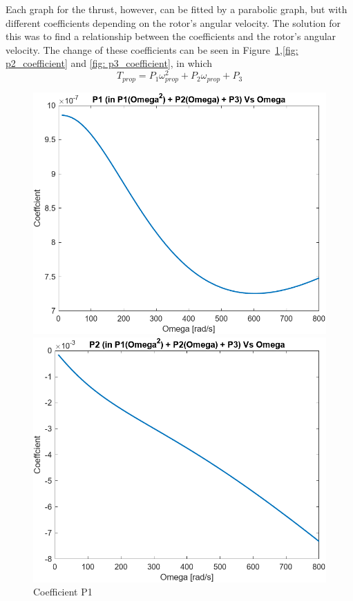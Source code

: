        Each graph for the thrust, however, can be fitted by a parabolic graph, but with different coefficients depending on the rotor's angular velocity. The solution for this was to find a relationship between the coefficients and the rotor's angular velocity. The change of these coefficients can be seen in Figure~\ref{fig: p1_coefficient},\ref{fig: p2_coefficient} and \ref{fig: p3_coefficient}, in which \[T_{prop} = P_1\omega_{prop}^2 + P_2\omega_{prop} +P_3\] 
        
        \begin{figure}[h]
            \centering
            \begin{minipage}{0.31\textwidth}
                \centering
                \includegraphics[width=\textwidth]{figs/Model/Props/P1_Coeffcient.png}
                \caption{Coefficient P1}
                \label{fig: p1_coefficient}
            \end{minipage}\hfill
            \begin{minipage}{0.31\textwidth}
                \centering
                \includegraphics[width=\textwidth]{figs/Model/Props/P2_Coeffcient.png}

\end{minipage}
\end{figure}
